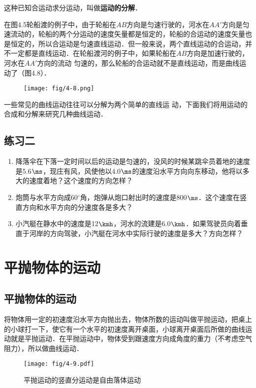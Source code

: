 这种已知合运动求分运动，叫做\textbf{运动的分解}．

在图4.5轮船渡的例子中，由于轮船在$AB$方向是匀速行驶的，河水在$AA'$方向是匀速流动的，轮船的两个分运动的速度矢量都是恒定的，轮船的合运动的速度矢量也是恒定的，所以合运动是匀速直线运动．但一般来说，两个直线运动的合运动，并不一定都是直线运动．在轮船渡河的例子中，如果轮船在$AB$方向是加速行驶的，河水在$AA'$方向的流动
匀速的，那么轮船的合运动就不是直线运动，而是曲线运动了（图4.8）．

\begin{figure}[htp]
    \centering
    \texttt{[image: fig/4-8.png]}
    \caption{}
    \end{figure}

一些常见的曲线运动往往可以分解为两个简单的直线运
动，下面我们将用运动的合成和分解来研究几种曲线运动．

\subsection*{练习二}
\begin{enumerate}
	\item 降落伞在下落一定时间以后的运动是匀速的，没风的时候某跳伞员着地的速度是5.6$\ms$，现庄有风，风使他以4.0$\ms$的速度沿水平方向向东移动，他将以多大的速度着地？这个速度的方向怎样？
\item 炮筒与水平方向成60$^\circ$角，炮弹从炮口射出时的速度是800$\ms$．这个速度在竖直方向和水平方向的分速度各是多大？
\item 小汽艇在静水中的速度是12$\kmh$，河水的流建是6.0$\kmh$．如果驾驶员向着垂直于河岸的方向驾驶，小汽艇在河水中实际行驶的速度是多大？方向怎样？
\end{enumerate}


\section{平抛物体的运动}
\subsection{平抛物体的运动} 

将物体用一定的初速度沿水平方向抛出去，物体所数的运动叫做平抛运动，把桌上的小球打一下，使它有一个水平的初速度离开桌面，小球离开桌面后所做的曲线运动就是平抛运动．在平抛运动中，物体受到跟速度方向成角度的重力（不考虑空气阻力），所以做曲线运动．

\begin{figure}[htp]
    \centering
    \texttt{[image: fig/4-9.pdf]}
    \caption{平抛运动的竖直分运动是自由落体运动}
    \end{figure}

